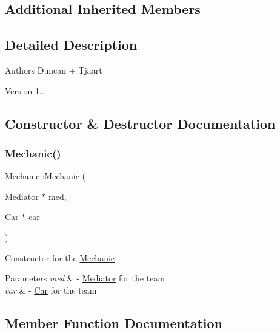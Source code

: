 \subsection*{Additional Inherited Members}


\subsection{Detailed Description}
\begin{DoxyAuthor}{Authors}
Duncan + Tjaart 
\end{DoxyAuthor}
\begin{DoxyVersion}{Version}
1.. 
\end{DoxyVersion}


\subsection{Constructor \& Destructor Documentation}
\mbox{\label{class_mechanic_a919f634b4363111e9e17b2c6dd29b9c8}} 
\subsubsection{\texorpdfstring{Mechanic()}{Mechanic()}}
{\footnotesize\ttfamily Mechanic\+::\+Mechanic (\begin{DoxyParamCaption}\item[{\mbox{\hyperlink{class_mediator}{Mediator}} $\ast$}]{med,  }\item[{\mbox{\hyperlink{class_car}{Car}} $\ast$}]{car }\end{DoxyParamCaption})\hspace{0.3cm}{\ttfamily [inline]}}

Constructor for the \mbox{\hyperlink{class_mechanic}{Mechanic}} 
\begin{DoxyParams}{Parameters}
{\em med} & -\/ \mbox{\hyperlink{class_mediator}{Mediator}} for the team \\
\hline
{\em car} & -\/ \mbox{\hyperlink{class_car}{Car}} for the team \\
\hline
\end{DoxyParams}


\subsection{Member Function Documentation}
\mbox{\label{class_mechanic_a6a67e4933d517b8e0a78763d80c82fd8}} 
